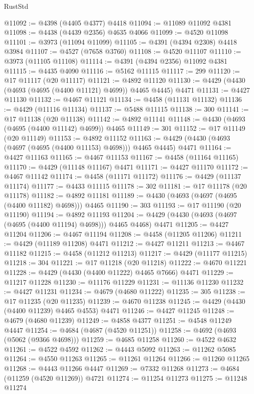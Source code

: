 \begin{lexlean}{RustStd}
\begin{coremodule}
{\begin{coremodule}
{{{{{{{{{{{{{{{{{{{{{{{{{{{{{{{{{{{{{{{{{{{{{{{{{{{{{{{{{{{{{{{{{{{{@11092 := @4398 (@4405 @4377) @4418
@11094 := @11089 @11092 @4381
@11098 := @4438 (@4439 @2356) @4635 @4066
@11099 := @4520 @11098
@11101 := @3973 (@11094 @11099)
@11105 := @4391 (@4394 @2308) @4418 @3984
@11107 := @4527 (@7658 @3760)
@11108 := @4520 @11107
@11110 := @3973 (@11105 @11108)
@11114 := @4391 (@4394 @2356) @11092 @4381
@11115 := @4435 @4090
@11116 := @5162 @11115
@11117 := 299
@11120 := @17 @11117 (@20 @11117)
@11121 := @4892 @11120
@11130 := @4429 (@4430 (@4693 (@4695 (@4400 @11121) @4699)) @4465 @4445) @4471
@11131 := @4427 @11130
@11132 := @4467 @11121
@11134 := @4458 (@11131 @11132)
@11136 := @4429 (@11116 @11134)
@11137 := @5488 @11115
@11138 := 300
@11141 := @17 @11138 (@20 @11138)
@11142 := @4892 @11141
@11148 := @4430 (@4693 (@4695 (@4400 @11142) @4699)) @4465
@11149 := 301
@11152 := @17 @11149 (@20 @11149)
@11153 := @4892 @11152
@11163 := @4429 (@4430 (@4693 (@4697 (@4695 (@4400 @11153) @4698))) @4465 @4445) @4471
@11164 := @4427 @11163
@11165 := @4467 @11153
@11167 := @4458 (@11164 @11165)
@11170 := @4429 (@11148 @11167) @4471
@11171 := @4427 @11170
@11172 := @4467 @11142
@11174 := @4458 (@11171 @11172)
@11176 := @4429 (@11137 @11174)
@11177 := @4433 @11115
@11178 := 302
@11181 := @17 @11178 (@20 @11178)
@11182 := @4892 @11181
@11189 := @4430 (@4693 (@4697 (@4695 (@4400 @11182) @4698))) @4465
@11190 := 303
@11193 := @17 @11190 (@20 @11190)
@11194 := @4892 @11193
@11204 := @4429 (@4430 (@4693 (@4697 (@4695 (@4400 @11194) @4698))) @4465 @4468) @4471
@11205 := @4427 @11204
@11206 := @4467 @11194
@11208 := @4458 (@11205 @11206)
@11211 := @4429 (@11189 @11208) @4471
@11212 := @4427 @11211
@11213 := @4467 @11182
@11215 := @4458 (@11212 @11213)
@11217 := @4429 (@11177 @11215)
@11218 := 304
@11221 := @17 @11218 (@20 @11218)
@11222 := @4670 @11221
@11228 := @4429 (@4430 (@4400 @11222) @4465 @7666) @4471
@11229 := @11217 @11228
@11230 := @11176 @11229
@11231 := @11136 @11230
@11232 := @4427 @11231
@11234 := @4679 (@4680 @11222)
@11235 := 305
@11238 := @17 @11235 (@20 @11235)
@11239 := @4670 @11238
@11245 := @4429 (@4430 (@4400 @11239) @4465 @4553) @4471
@11246 := @4427 @11245
@11248 := @4679 (@4680 @11239)
@11249 := @4858 @4377
@11251 := @4548 @11249 @4447
@11254 := @4684 (@4687 (@4520 @11251))
@11258 := @4692 (@4693 (@5062 (@9366 @4698)))
@11259 := @4685 @11258
@11260 := @4522 @4632
@11261 := @4522 @4592
@11262 := @4443 @5092
@11263 := @11262 @5085
@11264 := @4550 @11263
@11265 := @11261 @11264
@11266 := @11260 @11265
@11268 := @4443 @11266 @4447
@11269 := @7332 @11268
@11273 := @4684 (@11259 (@4520 @11269)) @4721
@11274 := @11254 @11273
@11275 := @11248 @11274
}}}}}}}}}}}}}}}}}}}}}}}}}}}}}}}}}}}}}}}}}}}}}}}}}}}}}}}}}}}}}}}}}}}}
\end{coremodule}}
\end{coremodule}
\end{lexlean}
